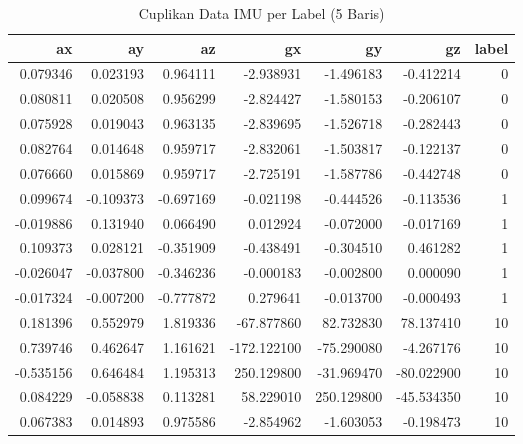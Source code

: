 \begin{table}[htbp]
\centering
\begin{table}
\caption{Cuplikan Data IMU per Label (5 Baris)}
\label{tab:cuplikan_imu}
\begin{tabular}{rrrrrrr}
\toprule
ax & ay & az & gx & gy & gz & label \\
\midrule
0.079346 & 0.023193 & 0.964111 & -2.938931 & -1.496183 & -0.412214 & 0 \\
0.080811 & 0.020508 & 0.956299 & -2.824427 & -1.580153 & -0.206107 & 0 \\
0.075928 & 0.019043 & 0.963135 & -2.839695 & -1.526718 & -0.282443 & 0 \\
0.082764 & 0.014648 & 0.959717 & -2.832061 & -1.503817 & -0.122137 & 0 \\
0.076660 & 0.015869 & 0.959717 & -2.725191 & -1.587786 & -0.442748 & 0 \\
0.099674 & -0.109373 & -0.697169 & -0.021198 & -0.444526 & -0.113536 & 1 \\
-0.019886 & 0.131940 & 0.066490 & 0.012924 & -0.072000 & -0.017169 & 1 \\
0.109373 & 0.028121 & -0.351909 & -0.438491 & -0.304510 & 0.461282 & 1 \\
-0.026047 & -0.037800 & -0.346236 & -0.000183 & -0.002800 & 0.000090 & 1 \\
-0.017324 & -0.007200 & -0.777872 & 0.279641 & -0.013700 & -0.000493 & 1 \\
0.181396 & 0.552979 & 1.819336 & -67.877860 & 82.732830 & 78.137410 & 10 \\
0.739746 & 0.462647 & 1.161621 & -172.122100 & -75.290080 & -4.267176 & 10 \\
-0.535156 & 0.646484 & 1.195313 & 250.129800 & -31.969470 & -80.022900 & 10 \\
0.084229 & -0.058838 & 0.113281 & 58.229010 & 250.129800 & -45.534350 & 10 \\
0.067383 & 0.014893 & 0.975586 & -2.854962 & -1.603053 & -0.198473 & 10 \\
\bottomrule
\end{tabular}
\end{table}
\end{table}
